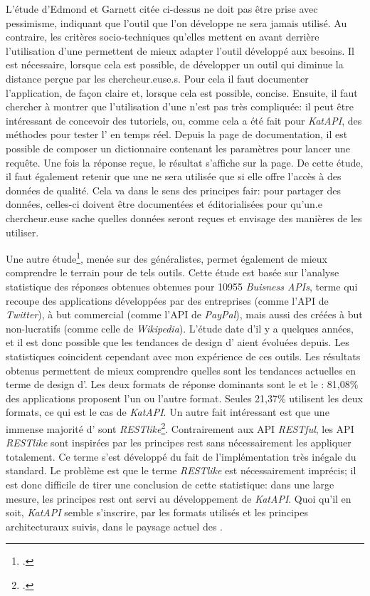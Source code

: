 L'étude d'Edmond et Garnett citée ci-dessus ne doit pas être prise avec pessimisme, indiquant que l'outil que l'on développe ne sera jamais utilisé. Au contraire, les critères socio-techniques qu'elles mettent en avant derrière l'utilisation d'une \api{} permettent de mieux adapter l'outil développé aux besoins. Il est nécessaire, lorsque cela est possible, de développer un outil qui diminue la distance perçue par les chercheur.euse.s. Pour cela il faut documenter l'application, de façon claire et, lorsque cela est possible, concise. Ensuite, il faut chercher à montrer que l'utilisation d'une \api{} n'est pas très compliquée: il peut être intéressant de concevoir des tutoriels, ou, comme cela a été fait pour \textit{KatAPI}, des méthodes pour tester l'\api{} en temps réel. Depuis la page de documentation, il est possible de composer un \gls{dictionnaire} contenant les paramètres pour lancer une requête. Une fois la réponse reçue, le résultat s'affiche sur la page. De cette étude, il faut également retenir que une \api{} ne sera utilisée que si elle offre l'accès à des données de qualité. Cela va dans le sens des principes \gls{fair}: pour partager des données, celles-ci doivent être documentées et éditorialisées pour qu'un.e chercheur.euse sache quelles données seront reçues et envisage des manières de les utiliser.

Une autre étude\footcite{corral_towards_2014}, menée sur des \api{} généralistes, permet également de mieux comprendre le terrain pour de tels outils. Cette étude est basée sur l'analyse statistique des réponses obtenues obtenues pour 10955 \textit{Buisness APIs}, terme qui recoupe des applications développées par des entreprises (comme l'API de \textit{Twitter}), à but commercial (comme l'API de \textit{PayPal}), mais aussi des \api{} créées à but non-lucratifs (comme celle de \textit{Wikipedia}). L'étude date d'il y a quelques années, et il est donc possible que les tendances de design d'\api{} aient évoluées depuis. Les statistiques coincident cependant avec mon expérience de ces outils. Les résultats obtenus permettent de mieux comprendre quelles sont les tendances actuelles en terme de design d'\api{}. Les deux formats de réponse dominants sont le \json{} et le \xml{}: 81,08\% des applications proposent l'un ou l'autre format. Seules 21,37\% utilisent les deux formats, ce qui est le cas de \textit{KatAPI}. Un autre fait intéressant est que une immense majorité d'\api{} sont \textit{RESTlike}\footcite[p. 3]{corral_towards_2014}. Contrairement aux API \textit{RESTful}, les API \textit{RESTlike} sont inspirées par les principes \gls{rest} sans nécessairement les appliquer totalement. Ce terme s'est développé du fait de l'implémentation très inégale du standard. Le problème est que le terme \textit{RESTlike} est nécessairement imprécis; il est donc difficile de tirer une conclusion de cette statistique: dans une large mesure, les principes \gls{rest} ont servi au développement de \textit{KatAPI}. Quoi qu'il en soit, \textit{KatAPI} semble s'inscrire, par les formats utilisés et les principes architecturaux suivis, dans le paysage actuel des \api{}.

